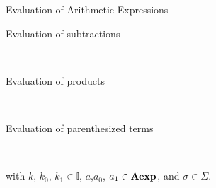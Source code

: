 \documentclass{beamer}
\begin{document}
\begin{frame}{\large Evaluation of Arithmetic Expressions}
\begin{description}
\item[Evaluation of subtractions]\hspace{1in}\\
\begin{prooftree}
 \end{prooftree}

 \item[Evaluation of products]\hspace{1in}\\
\begin{prooftree}
\end{prooftree}

 \item[Evaluation of parenthesized terms]\hspace{1in}\\
\begin{prooftree}
\end{prooftree}
\end{description}

with $k$, $k_0$, $k_1  \in \mathbb{I}$, $a$,$a_0$, $a_1 \in \syntaxset{Aexp}$, and
$\sigma \in \Sigma$.
\end{frame}
\end{document}
